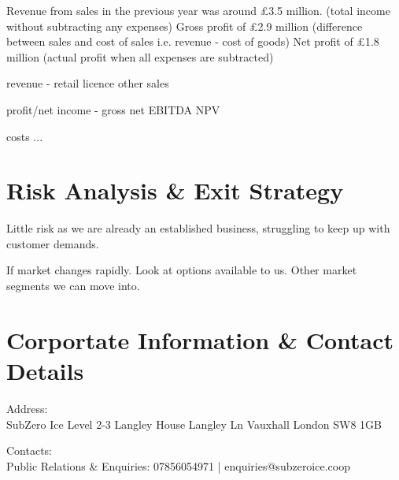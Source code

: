 \documentclass{article}
\begin{document}
Revenue from sales in the previous year was around £3.5 million. (total income without subtracting any expenses) 
Gross profit of £2.9 million (difference between sales and cost of sales i.e. revenue - cost of goods)
Net profit of £1.8 million (actual profit when all expenses are subtracted)



revenue
 - retail
   licence
   other sales

profit/net income
 - gross
   net
   EBITDA
   NPV

costs
 ...

\section{Risk Analysis \& Exit Strategy}

Little risk as we are already an established business, struggling to keep up with customer demands.

If market changes rapidly. Look at options available to us. Other market segments we can move into.



\section{Corportate Information \& Contact Details}

Address: \\

SubZero Ice
Level 2-3 
Langley House
Langley Ln
Vauxhall
London
SW8 1GB

Contacts: \\

Public Relations \& Enquiries: 07856054971 | enquiries@subzeroice.coop
\end{document}
